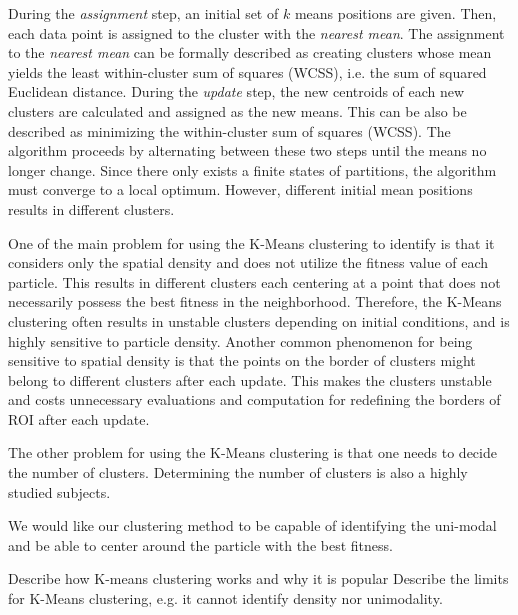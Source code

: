 During the \textit{assignment} step, an initial set of $k$ means positions are given.
Then, each data point is assigned to the cluster with the \textit{nearest mean}.
The assignment to the \textit{nearest mean} can be formally described 
as creating clusters whose mean yields the least within-cluster sum of squares (WCSS), i.e. the sum of squared Euclidean distance.
During the \textit{update} step, the new centroids of each new clusters are calculated and assigned as the new means.
This can be also be described as minimizing the within-cluster sum of squares (WCSS).
The algorithm proceeds by alternating between these two steps until the means no longer change.
Since there only exists a finite states of partitions, the algorithm must converge to a local optimum.
However, different initial mean positions results in different clusters.

One of the main problem for using the K-Means clustering to identify  is that
it considers only the spatial density and does not utilize the fitness value of each particle.
This results in different clusters each centering at a point that does not necessarily possess the best fitness in the neighborhood.
Therefore, the K-Means clustering often results in unstable clusters depending on initial conditions, and is highly sensitive to particle density.
Another common phenomenon for being sensitive to spatial density is that 
the points on the border of clusters might belong to different clusters after each update.
This makes the clusters unstable and costs unnecessary evaluations and computation for redefining the borders of ROI after each update. 

The other problem for using the K-Means clustering is that one needs to decide the number of clusters.
Determining the number of clusters is also a highly studied subjects.

We would like our clustering method to be capable of identifying the uni-modal and be able to center around the particle with the best fitness.



Describe how K-means clustering works and why it is popular Describe the limits for K-Means clustering, 
e.g. it cannot identify density nor unimodality.  

